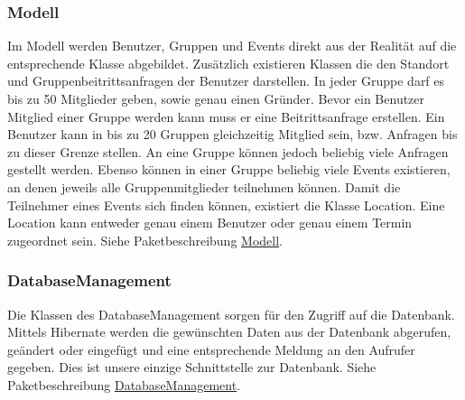 	\subsubsection{Modell}
Im Modell werden Benutzer, Gruppen und Events direkt aus der Realität auf die entsprechende Klasse abgebildet. Zusätzlich existieren Klassen die den Standort und Gruppenbeitrittsanfragen der Benutzer darstellen.
In jeder Gruppe darf es bis zu 50 Mitglieder geben, sowie genau einen Gründer. Bevor ein Benutzer Mitglied einer Gruppe werden kann muss er eine Beitrittsanfrage erstellen.
Ein Benutzer kann in bis zu 20 Gruppen gleichzeitig Mitglied sein, bzw. Anfragen bis zu dieser Grenze stellen.
An eine Gruppe können jedoch beliebig viele Anfragen gestellt werden.
Ebenso können in einer Gruppe beliebig viele Events existieren, an denen jeweils alle Gruppenmitglieder teilnehmen können.
Damit die Teilnehmer eines Events sich finden können, existiert die Klasse Location. Eine Location kann entweder genau einem Benutzer oder genau einem Termin zugeordnet sein. 
\newline
Siehe Paketbeschreibung \hyperlink{database.model}{Modell}.
\begin {center}
\end {center}



	\subsubsection{DatabaseManagement}
	Die Klassen des DatabaseManagement sorgen für den Zugriff auf die Datenbank.
	Mittels Hibernate werden die gewünschten Daten aus der Datenbank abgerufen, geändert oder eingefügt und eine entsprechende Meldung an den Aufrufer gegeben.
	Dies ist unsere einzige Schnittstelle zur Datenbank.	
	\newline
Siehe Paketbeschreibung \hyperlink{database.management}{DatabaseManagement}.

